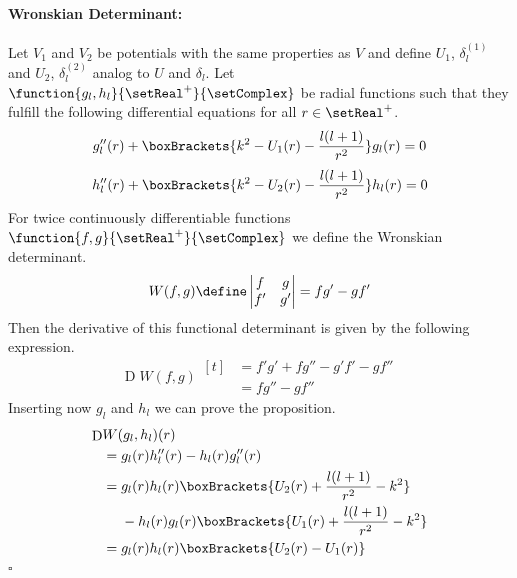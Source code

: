 \documentclass[10pt,fleqn]{article}
\DeclareMathOperator{\derivative}{\mathrm{D}}
\begin{document}
\begin{multicols}{2}
      \paragraph{Wronskian Determinant:}
      Let $V_1$ and $V_2$ be potentials with the same properties as $V$ and define $U_1$, $δ_l^{(1)}$ and $U_2$, $δ_l^{(2)}$ analog to $U$ and $δ_l$.
      Let $\function{g_l,h_l}{\setReal^+}{\setComplex}$ be radial functions such that they fulfill the following differential equations for all $r\in\setReal^+$.
      \[
        g_l''(r) + \boxBrackets{k^2-U_1(r)-\frac{l(l+1)}{r^2}}g_l(r) = 0
      \]
      \[
        h_l''(r) + \boxBrackets{k^2-U_2(r)-\frac{l(l+1)}{r^2}}h_l(r) = 0
      \]
      For twice continuously differentiable functions $\function{f,g}{\setReal^+}{\setComplex}$ we define the Wronskian determinant.
      \[
        W(f,g)\define
        \begin{vmatrix}
          f & g \\
          f' & g'
        \end{vmatrix}
        = fg' - gf'
      \]
      Then the derivative of this functional determinant is given by the following expression.
      \[
        \derivative W(f,g)
        \begin{aligned}[t]
          &= f'g' + fg'' - g'f' - gf'' \\
          &= fg'' - gf''
        \end{aligned}
      \]
      Inserting now $g_l$ and $h_l$ we can prove the proposition.
      \[
        \begin{aligned}[t]
          \derivative &W(g_l,h_l)(r) \\
          &= g_l(r) h_l''(r) - h_l(r) g_l''(r) \\
          &=
            \begin{aligned}[t]
              &g_l(r) h_l(r) \boxBrackets{U_2(r) + \frac{l(l+1)}{r^2} - k^2} \\
              &-h_l(r) g_l(r) \boxBrackets{U_1(r) + \frac{l(l+1)}{r^2} - k^2} \\
            \end{aligned}
          \\
          &= g_l(r) h_l(r) \boxBrackets{U_2(r) - U_1(r)}
        \end{aligned}
      \]
      \hfill$\square$


\end{multicols}
\end{document}
